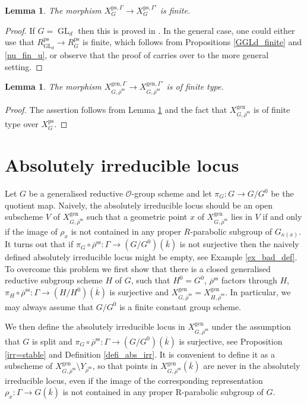 \documentclass{amsart}
\newtheorem{lem}[prop]{Lemma}
\theoremstyle{definition}
\theoremstyle{remark}
\DeclareMathOperator{\GL}{GL}
\newcommand{\OO}{\mathcal O}
\newcommand{\rhobar}{\overline{\rho}}
\newcommand{\ps}{\mathrm{ps}}
\newcommand{\gen}{\mathrm{gen}}
\newcommand{\kbar}{\overline{k}}
\newcommand{\rhobarss}{\rhobar^{\mathrm{ss}}}
\begin{document}
\begin{lem}\label{finite_EF} The morphism $X^{\ps, \Gamma}_{G}\rightarrow X^{\ps,\Gamma'}_{G}$ is finite.
\end{lem}
\begin{proof} If $G=\GL_d$ then this is proved in \cite[Lemma A.3]{BIP_new}. 
In the general case, one could either use that $R^{\ps}_{\GL_d}\rightarrow R^{\ps}_G$ is finite, 
which follows from Propositions \ref{GGLd_finite} and \ref{nu_fin_u}, or observe that the proof of 
\cite[Lemma A.3]{BIP_new} carries over to the more general setting.
\end{proof} 

\begin{lem}\label{type_type_EF} The morphism $X^{\gen,\Gamma}_{G, \rhobarss}\rightarrow X^{\gen,\Gamma'}_{G, \rhobarss}$ is of finite type. 
\end{lem} 
\begin{proof} The assertion follows from Lemma \ref{finite_EF} and the fact that $X^{\gen}_{G,\rhobarss}$ is of finite type over $X^{\ps}_G$.
\end{proof}


 \section{Absolutely irreducible locus}\label{sec_abs_irr}
Let $G$ be a generalised reductive $\OO$-group scheme and let $\pi_G: G\rightarrow 
G/G^0$ be the quotient map. Naively, the absolutely irreducible locus should be an open  
subscheme $V$ of $X^{\gen}_{G, \rhobarss}$ such that a geometric point $x$ of $X^{\gen}_{G, \rhobarss}$ lies in $V$ if and only if the image of $\rho_x$ is not contained in any 
proper $R$-parabolic subgroup of $G_{\kappa(x)}$. 
It turns out that if $\pi_G\circ \rhobarss: \Gamma \rightarrow (G/G^0)(\kbar)$ 
is not surjective then the naively defined absolutely irreducible locus might be empty, see Example \ref{ex_bad_def}. To overcome this problem  
we first show that there is a closed generalised 
reductive subgroup scheme $H$ of $G$, such that $H^0=G^0$, $\rhobarss$ factors through $H$,  
$\pi_H\circ \rhobarss: \Gamma \rightarrow (H/H^0)(\overline{k})$ is surjective and $X^{\gen}_{G, \rhobarss}= X^{\gen}_{H,\rhobarss}$.  In particular, we may always assume that
$G/G^0$ is a finite constant group scheme. 

We then define the absolutely irreducible locus 
in $X^{\gen}_{G, \rhobarss}$ under the assumption 
that $G$ is split and $\pi_G \circ \rhobarss: \Gamma \rightarrow (G/G^0)(\overline{k})$ is surjective, see Proposition \ref{irr=stable} and Definition \ref{defi_abs_irr}. It is convenient to define it as a subscheme of $X^{\gen}_{G, \rhobarss}\setminus Y_{\rhobarss}$, so that points in $X^{\gen}_{G, \rhobarss}(\kbar)$ are never in the absolutely 
irreducible locus, even if the image of the corresponding representation $\rho_x: \Gamma \rightarrow G(\kbar)$ is not contained in any proper R-parabolic subgroup of $G$. 
\end{document}
